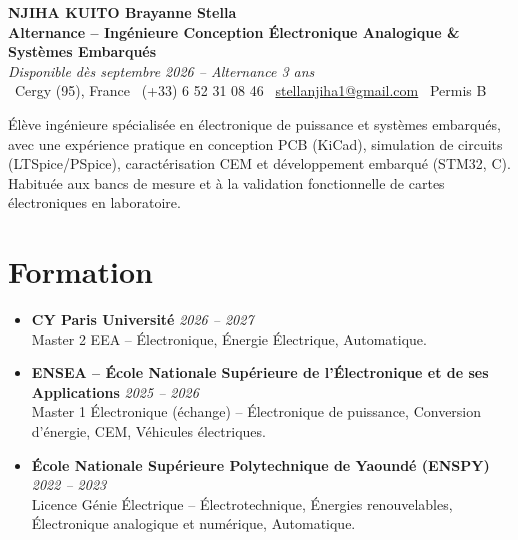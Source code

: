 \documentclass[a4paper,11pt]{article}
\begin{document}
\begin{center}
    {\Large \textbf{NJIHA KUITO Brayanne Stella}} \\ \vspace{4pt}
    \textbf{\large Alternance -- Ingénieure Conception Électronique Analogique \& Systèmes Embarqués} \\
    \textit{\small Disponible dès septembre 2026 -- Alternance 3 ans} \\ \vspace{4pt}
    \small
    \faMapMarker\ Cergy (95), France \quad
    \faPhone\ (+33) 6 52 31 08 46 \quad
    \faEnvelope\ \href{mailto:stellanjiha1@gmail.com}{stellanjiha1@gmail.com} \quad
    \faCar\ Permis B
\end{center}

\vspace{-4pt}

\noindent\small{Élève ingénieure spécialisée en électronique de puissance et systèmes embarqués, avec une expérience pratique en conception PCB (KiCad), simulation de circuits (LTSpice/PSpice), caractérisation CEM et développement embarqué (STM32, C). Habituée aux bancs de mesure et à la validation fonctionnelle de cartes électroniques en laboratoire.}

\vspace{4pt}

\section{Formation}
\begin{itemize}[leftmargin=*, label=\tiny$\bullet$, nosep]
    \item \textbf{CY Paris Université} \hfill \textit{2026 -- 2027} \\
    \small{Master 2 EEA -- Électronique, Énergie Électrique, Automatique.}
    \item \textbf{ENSEA -- École Nationale Supérieure de l'Électronique et de ses Applications} \hfill \textit{2025 -- 2026} \\
    \small{Master 1 Électronique (échange) -- Électronique de puissance, Conversion d'énergie, CEM, Véhicules électriques.}
    \item \textbf{École Nationale Supérieure Polytechnique de Yaoundé (ENSPY)} \hfill \textit{2022 -- 2023} \\
    \small{Licence Génie Électrique -- Électrotechnique, Énergies renouvelables, Électronique analogique et numérique, Automatique.}
\end{itemize}
\end{document}
